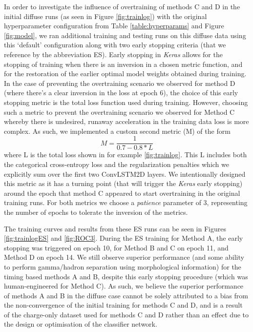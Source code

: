 In order to investigate the influence of overtraining of methods C and D in the initial diffuse runs (as seen in Figure \ref{fig:trainlog}) with the original hyperparameter configuration from Table \ref{table:hyperparams} and Figure \ref{fig:model}, we ran additional training and testing runs on this diffuse data using this `default' configuration along with two early stopping criteria (that we reference by the abbreviation ES). Early stopping in \textit{Keras} allows for the stopping of training when there is an inversion in a chosen metric function, and for the restoration of the earlier optimal model weights obtained during training. In the case of preventing the overtraining scenario we observed for method D (where there's a clear inversion in the loss at epoch 6), the choice of this early stopping metric is the total loss function used during training. However, choosing such a metric to prevent the overtraining scenario we observed for Method C whereby there is undesired, runaway acceleration in the training data loss is more complex. As such, we implemented a custom second metric (M) of the form
\begin{equation}
    M=\frac{1}{0.7-0.8*L}
\end{equation}
where L is the total loss shown in for example \ref{fig:trainlog}. This L includes both the categorical cross-entropy loss and the regularization penalties which we explicitly sum over the first two ConvLSTM2D layers. We intentionally designed this metric as it has a turning point (that will trigger the \textit{Keras} early stopping) around the epoch that method C appeared to start overtraining in the original training runs. For both metrics we choose a \textit{patience} parameter of 3, representing the number of epochs to tolerate the inversion of the metrics.

The training curves and results from these ES runs can be seen in Figures \ref{fig:trainlogES} and \ref{fig:ROC3}. During the ES training for Method A, the early stopping was triggered on epoch 10, for Method B and C on epoch 11, and Method D on epoch 14. We still observe superior performance (and some ability to perform gamma/hadron separation using morphological information) for the timing based methods A and B, despite this early stopping procedure (which was human-engineered for Method C). As such, we believe the superior performance of methods A and B in the diffuse case cannot be solely attributed to a bias from the non-convergence of the initial training for methods C and D, and is a result of the charge-only dataset used for methods C and D rather than an effect due to the design or optimisation of the classifier network.

